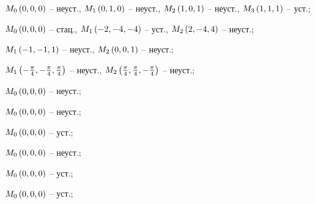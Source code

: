 \begin{enumsols}
		\label{sol:stability_zeros:firstapprox3d}
		\item \( M_0 \left( 0, 0, 0 \right) \) -- неуст., \( M_1 \left( 0, 1, 0 \right) \) -- неуст., \( M_2 \left( 1, 0, 1 \right) \) -- неуст., \( M_3 \left( 1, 1, 1 \right) \) -- уст.; %
		\item \( M_0 \left( 0, 0, 0 \right) \) -- стац., \( M_1 \left( -2, -4, -4 \right) \) -- уст., \( M_2 \left( 2, -4, 4 \right) \) -- неуст.; %
		\item \( M_1 \left( -1, -1, 1 \right) \) -- неуст., \( M_2 \left( 0, 0, 1 \right) \) -- неуст.; %
		\item \( M_1 \left( -\frac{\pi}{4}, -\frac{\pi}{4}, \frac{\pi}{4} \right) \) -- неуст., \( M_2 \left( \frac{\pi}{4}, \frac{\pi}{4}, -\frac{\pi}{4} \right) \) -- неуст.; %

		\label{sol:stability_zeros:firstapprox3d_zero}
		\item \( M_0 \left( 0, 0, 0 \right) \) -- неуст.;  %
		\item \( M_0 \left( 0, 0, 0 \right) \) -- неуст.; %
		\item \( M_0 \left( 0, 0, 0 \right) \) -- уст.;  %
		\item \( M_0 \left( 0, 0, 0 \right) \) -- неуст.; %
		\item \( M_0 \left( 0, 0, 0 \right) \) -- уст.; %
		\item \( M_0 \left( 0, 0, 0 \right) \) -- уст.; %

	\end{enumsols}

